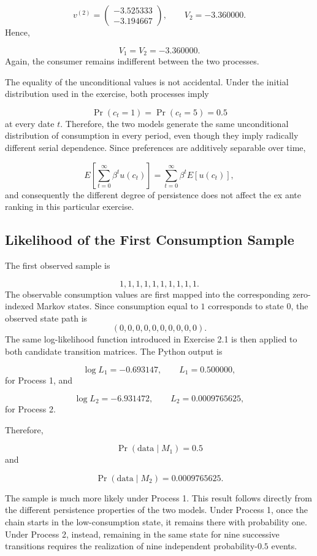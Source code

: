\documentclass[11pt]{article}
\begin{document}
\[
v^{(2)}=
\begin{pmatrix}
-3.525333\\
-3.194667
\end{pmatrix},
\qquad
V_2=-3.360000.
\]
Hence,

\[
\boxed{V_1=V_2=-3.360000}.
\]
Again, the consumer remains indifferent between the two processes.

The equality of the unconditional values is not accidental. Under the initial
distribution used in the exercise, both processes imply

\[
\Pr(c_t=1)=\Pr(c_t=5)=0.5
\]
at every date $t$. Therefore, the two models generate the same unconditional
distribution of consumption in every period, even though they imply radically
different serial dependence. Since preferences are additively separable over
time,

\[
E\left[\sum_{t=0}^{\infty}\beta^t u(c_t)\right]
=
\sum_{t=0}^{\infty}\beta^t E[u(c_t)],
\]
and consequently the different degree of persistence does not affect the ex ante
ranking in this particular exercise.

\subsection*{Likelihood of the First Consumption Sample}

The first observed sample is

\[
1,1,1,1,1,1,1,1,1,1.
\]
The observable consumption values are first mapped into the corresponding
zero-indexed Markov states. Since consumption equal to $1$ corresponds to state
$0$, the observed state path is
\[
(0,0,0,0,0,0,0,0,0,0).
\]
The same log-likelihood function introduced in Exercise 2.1 is then applied to
both candidate transition matrices. The Python output is

\[
\log L_1=-0.693147,
\qquad
L_1=0.500000,
\]
for Process 1, and

\[
\log L_2=-6.931472,
\qquad
L_2=0.0009765625,
\]
for Process 2.

Therefore,

\[
\boxed{
\Pr(\text{data}\mid M_1)=0.5
}
\]
and

\[
\boxed{
\Pr(\text{data}\mid M_2)=0.0009765625
}.
\]

The sample is much more likely under Process 1. This result follows directly
from the different persistence properties of the two models. Under Process 1,
once the chain starts in the low-consumption state, it remains there with
probability one. Under Process 2, instead, remaining in the same state for nine
successive transitions requires the realization of nine independent
probability-$0.5$ events.
\end{document}
